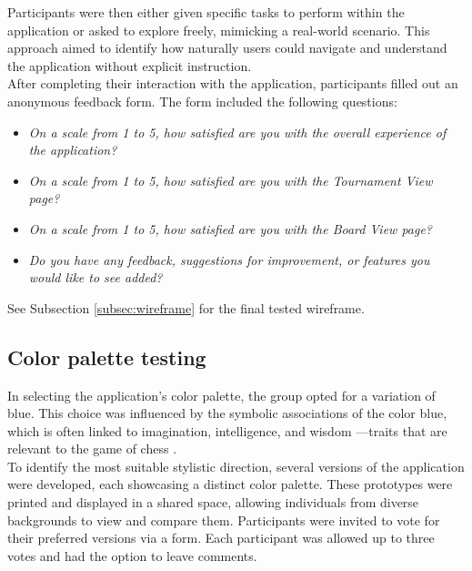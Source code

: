 Participants were then either given specific tasks to perform within the application or asked to explore freely, mimicking a real-world scenario. This approach aimed to identify how naturally users could navigate and understand the application without explicit instruction. \\

After completing their interaction with the application, participants filled out an anonymous feedback form. The form included the following questions:

\begin{itemize}
    \item \textit{On a scale from 1 to 5, how satisfied are you with the overall experience of the application?}
    \item \textit{On a scale from 1 to 5, how satisfied are you with the Tournament View page?}
    \item \textit{On a scale from 1 to 5, how satisfied are you with the Board View page?}
    \item \textit{Do you have any feedback, suggestions for improvement, or features you would like to see added?}
\end{itemize}

See Subsection \ref{subsec:wireframe} for the final tested wireframe.

\newpage

\subsection{Color palette testing}
\label{subsubsec:color-palette}

In selecting the application’s color palette, the group opted for a variation of blue. This choice was influenced by the symbolic associations of the color blue, which is often linked to imagination, intelligence, and wisdom \cite{blue}—traits that are relevant to the game of chess \cite{chess:ppqty, chess:chess-and-creativity}. \\

To identify the most suitable stylistic direction, several versions of the application were developed, each showcasing a distinct color palette. These prototypes were printed and displayed in a shared space, allowing individuals from diverse backgrounds to view and compare them. Participants were invited to vote for their preferred versions via a form. Each participant was allowed up to three votes and had the option to leave comments.




